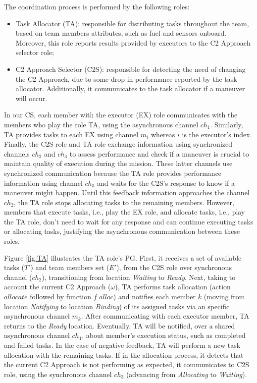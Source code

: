 The coordination process is performed by the following roles:

\begin{itemize}
    \item Task Allocator (TA): responsible for distributing tasks throughout the team, based on team members attributes, such as fuel and sensors onboard. Moreover, this role reports results provided by executors to the C2 Approach selector role;
    \item C2 Approach Selector (C2S): responsible for detecting the need of changing the C2 Approach, due to some drop in performance reported by the task allocator. Additionally, it communicates to the task allocator if a maneuver will occur.  
\end{itemize}

 In our CS, each member with the executor (EX) role communicates with the members who play the role TA, using the asynchronous channel \textit{$ch_1$}. Similarly, TA provides tasks to each EX using channel \textit{$m_i$} whereas $i$ is the executor's index. Finally, the C2S role and TA role exchange information using synchronized channels \textit{$ch_2$} and \textit{$ch_3$} to assess performance and check if a maneuver is crucial to maintain quality of execution during the mission. These latter channels use synchronized communication because the TA role provides performance information using channel \textit{$ch_3$} and waits for the C2S's response to know if a maneuver might happen. Until this feedback information approaches the channel \textit{$ch_2$}, the TA role stops allocating tasks to the remaining members. However, members that execute tasks, i.e., play the EX role, and allocate tasks, i.e., play the TA role, don't need to wait for any response and can continue executing tasks or allocating tasks, justifying the asynchronous communication between these roles.

Figure \ref{fig:TA} illustrates the TA role's PG. First, it receives a set of available tasks ($T'$) and team members set ($E'$), from the C2S role over synchronous channel ($ch_2$), transitioning from location \textit{Waiting} to \textit{Ready}. Next, taking to account the current C2 Approach ($\omega$), TA performs task allocation (action $allocate$ followed by function $f\_alloc$) and notifies each member $k$ (moving from location \textit{Notifying} to location \textit{Binding}) of its assigned tasks via an specific asynchronous channel $m_k$. After communicating with each executor member, TA returns to the \textit{Ready} location. Eventually, TA will be notified, over a shared asynchronous channel $ch_1$, about member's execution status, such as completed and failed tasks. In the case of negative feedback, TA will perform a new task allocation with the remaining tasks. If in the allocation process, it detects that the current C2 Approach is not performing as expected, it communicates to C2S role, using the synchronous channel $ch_3$ (advancing from \textit{Allocating} to \textit{Waiting}).

